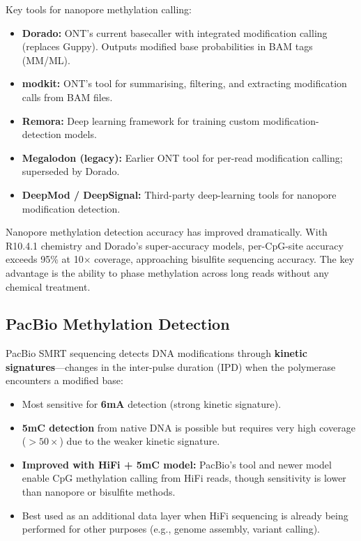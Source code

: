 Key tools for nanopore methylation calling:

\begin{itemize}[itemsep=2pt]
  \item \textbf{Dorado:} ONT's current basecaller with integrated modification calling (replaces Guppy). Outputs modified base probabilities in BAM tags (MM/ML).
  \item \textbf{modkit:} ONT's tool for summarising, filtering, and extracting modification calls from BAM files.
  \item \textbf{Remora:} Deep learning framework for training custom modification-detection models.
  \item \textbf{Megalodon (legacy):} Earlier ONT tool for per-read modification calling; superseded by Dorado.
  \item \textbf{DeepMod / DeepSignal:} Third-party deep-learning tools for nanopore modification detection.
\end{itemize}

\begin{tipbox}
Nanopore methylation detection accuracy has improved dramatically. With R10.4.1 chemistry and Dorado's super-accuracy models, per-CpG-site accuracy exceeds 95\% at 10$\times$ coverage, approaching bisulfite sequencing accuracy. The key advantage is the ability to phase methylation across long reads without any chemical treatment.
\end{tipbox}

\subsection{PacBio Methylation Detection}
\label{subsec:methylation:pacbio}

PacBio SMRT sequencing detects DNA modifications through \textbf{kinetic signatures}---changes in the inter-pulse duration (IPD) when the polymerase encounters a modified base:

\begin{itemize}[itemsep=2pt]
  \item Most sensitive for \textbf{6mA} detection (strong kinetic signature).
  \item \textbf{5mC detection} from native DNA is possible but requires very high coverage ($> 50\times$) due to the weaker kinetic signature.
  \item \textbf{Improved with HiFi + 5mC model:} PacBio's  tool and newer  model enable CpG methylation calling from HiFi reads, though sensitivity is lower than nanopore or bisulfite methods.
  \item Best used as an additional data layer when HiFi sequencing is already being performed for other purposes (e.g., genome assembly, variant calling).
\end{itemize}


